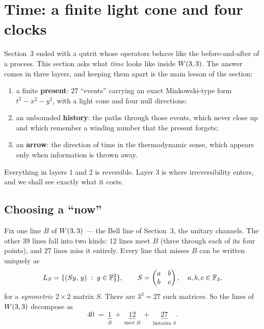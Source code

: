 \section{Time: a finite light cone and four clocks}
\label{sec:time}

Section~3 ended with a qutrit whose operators behave like the before-and-after of a
process. This section asks what \emph{time} looks like inside $W(3,3)$. The answer comes in
three layers, and keeping them apart is the main lesson of the section:
\begin{enumerate}[label=\textbf{\arabic*.},leftmargin=1.6em]
\item a finite \textbf{present}: $27$ ``events'' carrying an exact Minkowski-type form
      $t^2-x^2-y^2$, with a light cone and four null directions;
\item an unbounded \textbf{history}: the paths through those events, which never close up
      and which remember a winding number that the present forgets;
\item an \textbf{arrow}: the direction of time in the thermodynamic sense, which appears
      only when information is thrown away.
\end{enumerate}
Everything in layers 1 and 2 is reversible. Layer 3 is where irreversibility enters, and
we shall see exactly what it costs.

\subsection{Choosing a ``now''}

Fix one line $B$ of $W(3,3)$ --- the Bell line of Section~3, the unitary channels. The other
$39$ lines fall into two kinds: $12$ lines meet $B$ (three through each of its four
points), and $27$ lines miss it entirely. Every line that misses $B$ can be written
uniquely as
\[
L_S=\{(Sy,\,y)\;:\;y\in\mathbb{F}_3^2\},\qquad S=\begin{pmatrix}a&b\\ b&c\end{pmatrix},\quad a,b,c\in\mathbb{F}_3 ,
\]
for a \emph{symmetric} $2\times2$ matrix $S$. There are $3^3=27$ such matrices. So the
lines of $W(3,3)$ decompose as
\[
40\;=\;\underbrace{1}_{B}\;+\;\underbrace{12}_{\text{meet }B}\;+\;\underbrace{27}_{\text{histories } S}.
\]

